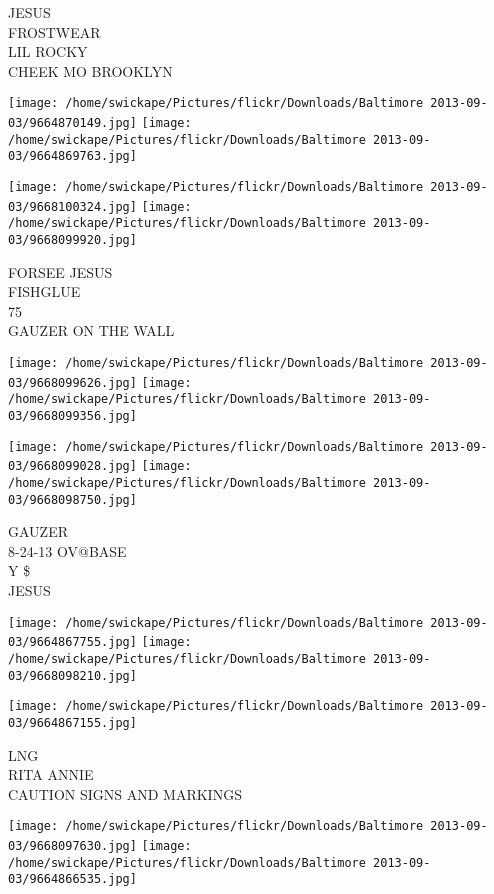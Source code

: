 \documentclass[10pt,letterpaper]{article}
\begin{document}
JESUS\\
FROSTWEAR\\
LIL ROCKY\\
CHEEK MO BROOKLYN
\pagebreak

\texttt{[image: /home/swickape/Pictures/flickr/Downloads/Baltimore 2013-09-03/9664870149.jpg]}
\texttt{[image: /home/swickape/Pictures/flickr/Downloads/Baltimore 2013-09-03/9664869763.jpg]}

\texttt{[image: /home/swickape/Pictures/flickr/Downloads/Baltimore 2013-09-03/9668100324.jpg]}
\texttt{[image: /home/swickape/Pictures/flickr/Downloads/Baltimore 2013-09-03/9668099920.jpg]}

FORSEE JESUS\\
FISHGLUE\\
75\\
GAUZER ON THE WALL
\pagebreak

\texttt{[image: /home/swickape/Pictures/flickr/Downloads/Baltimore 2013-09-03/9668099626.jpg]}
\texttt{[image: /home/swickape/Pictures/flickr/Downloads/Baltimore 2013-09-03/9668099356.jpg]}

\texttt{[image: /home/swickape/Pictures/flickr/Downloads/Baltimore 2013-09-03/9668099028.jpg]}
\texttt{[image: /home/swickape/Pictures/flickr/Downloads/Baltimore 2013-09-03/9668098750.jpg]}

GAUZER\\
8{-}24{-}13 OV@BASE\\
Y \$\\
JESUS
\pagebreak

\texttt{[image: /home/swickape/Pictures/flickr/Downloads/Baltimore 2013-09-03/9664867755.jpg]}
\texttt{[image: /home/swickape/Pictures/flickr/Downloads/Baltimore 2013-09-03/9668098210.jpg]}

\vspace{0.25in}
\texttt{[image: /home/swickape/Pictures/flickr/Downloads/Baltimore 2013-09-03/9664867155.jpg]}

LNG\\
RITA ANNIE\\
CAUTION SIGNS AND MARKINGS
\pagebreak

\texttt{[image: /home/swickape/Pictures/flickr/Downloads/Baltimore 2013-09-03/9668097630.jpg]}
\texttt{[image: /home/swickape/Pictures/flickr/Downloads/Baltimore 2013-09-03/9664866535.jpg]}
\end{document}
